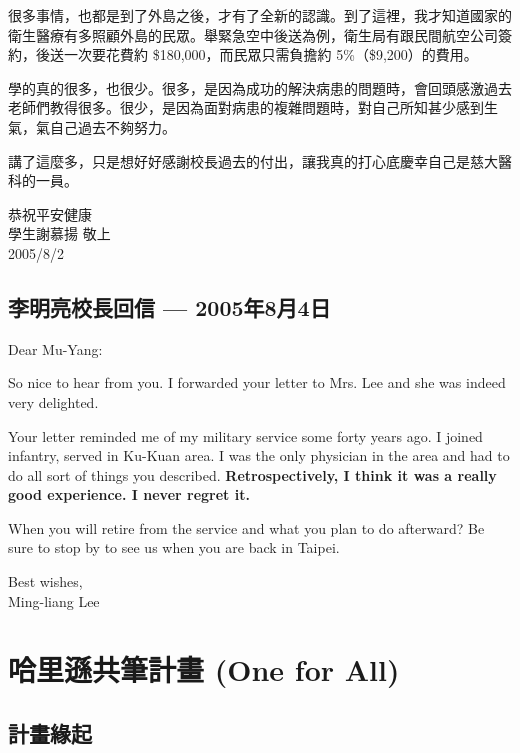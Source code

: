 \documentclass[12pt,a4paper]{article}
\begin{document}
很多事情，也都是到了外島之後，才有了全新的認識。到了這裡，我才知道國家的衛生醫療有多照顧外島的民眾。舉緊急空中後送為例，衛生局有跟民間航空公司簽約，後送一次要花費約 \$180,000，而民眾只需負擔約 5\%（\$9,200）的費用。

學的真的很多，也很少。很多，是因為成功的解決病患的問題時，會回頭感激過去老師們教得很多。很少，是因為面對病患的複雜問題時，對自己所知甚少感到生氣，氣自己過去不夠努力。

講了這麼多，只是想好好感謝校長過去的付出，讓我真的打心底慶幸自己是慈大醫科的一員。

\vspace{0.5cm}
\begin{flushright}
恭祝平安健康\\[0.3cm]
學生謝慕揚 敬上\\
2005/8/2
\end{flushright}

\subsection{李明亮校長回信 — 2005年8月4日}

Dear Mu-Yang:

So nice to hear from you. I forwarded your letter to Mrs. Lee and she was indeed very delighted.

Your letter reminded me of my military service some forty years ago. I joined infantry, served in Ku-Kuan area. I was the only physician in the area and had to do all sort of things you described. \textbf{Retrospectively, I think it was a really good experience. I never regret it.}

When you will retire from the service and what you plan to do afterward? Be sure to stop by to see us when you are back in Taipei.

\vspace{0.5cm}
\begin{flushright}
Best wishes,\\
Ming-liang Lee
\end{flushright}

\section{哈里遜共筆計畫 (One for All)}

\subsection{計畫緣起}
\end{document}
